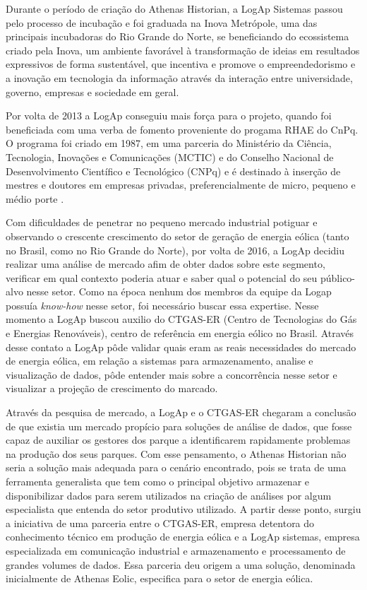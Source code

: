 Durante o período de criação do Athenas Historian, a LogAp Sistemas passou pelo processo de incubação e foi graduada na Inova Metrópole, uma das principais incubadoras do Rio Grande do Norte, se beneficiando do ecossistema criado pela Inova, um ambiente favorável à transformação de ideias em resultados expressivos de forma sustentável, que incentiva e promove o empreendedorismo e a inovação em tecnologia da informação através da interação entre universidade, governo, empresas e sociedade em geral.

Por volta de 2013 a LogAp conseguiu mais força para o projeto, quando foi beneficiada com uma verba de fomento proveniente do progama RHAE do CnPq. O programa foi criado em 1987, em uma parceria do Ministério da Ciência, Tecnologia, Inovações e Comunicações (MCTIC) e do Conselho Nacional de Desenvolvimento Científico e Tecnológico (CNPq) e é destinado à inserção de mestres e doutores em empresas privadas, preferencialmente de micro, pequeno e médio porte \cite{RHAE}.

Com dificuldades de penetrar no pequeno mercado industrial potiguar e observando o crescente crescimento do setor de geração de energia eólica (tanto no Brasil, como no Rio Grande do Norte), por volta de 2016, a LogAp decidiu realizar uma análise de mercado afim de obter dados sobre este segmento, verificar em qual contexto poderia atuar e saber qual o potencial do seu público-alvo nesse setor. Como na época nenhum dos membros da equipe da Logap possuía \textit{know-how} nesse setor, foi necessário buscar essa expertise. Nesse momento a LogAp buscou auxilio do CTGAS-ER (Centro de Tecnologias do Gás e Energias Renováveis), centro de referência em energia eólico no Brasil. Através desse contato a LogAp pôde validar quais eram as reais necessidades do mercado de energia eólica, em relação a sistemas para armazenamento, analise e visualização de dados, pôde entender mais sobre a concorrência nesse setor e visualizar a projeção de crescimento do marcado.

Através da pesquisa de mercado, a LogAp e o CTGAS-ER chegaram a conclusão de que existia um mercado propício para soluções de análise de dados, que fosse capaz de auxiliar os gestores dos parque a identificarem rapidamente problemas na produção dos seus parques. Com esse pensamento, o Athenas Historian não seria a solução mais adequada para o cenário encontrado, pois se trata de uma ferramenta generalista que tem como o principal objetivo armazenar e disponibilizar dados para serem utilizados na criação de análises por algum especialista que entenda do setor produtivo utilizado. A partir desse ponto, surgiu a iniciativa de uma parceria entre o CTGAS-ER, empresa detentora do conhecimento técnico em produção de energia eólica e a LogAp sistemas, empresa especializada em comunicação industrial e armazenamento e processamento de grandes volumes de dados. Essa parceria deu origem a uma solução, denominada inicialmente de Athenas Eolic, especifica para o setor de energia eólica.

